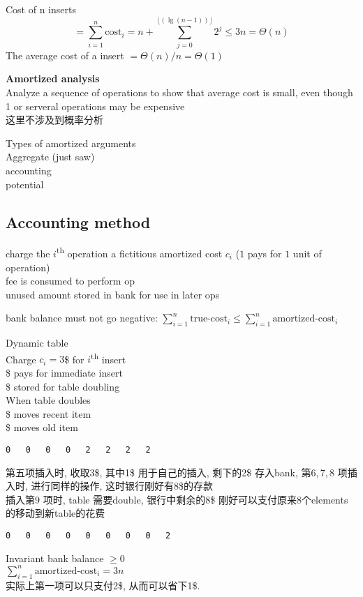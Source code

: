 \documentclass{article}
\begin{document}
Cost of n inserts
$$
=\sum_{i=1}^n \mbox{cost}_i
=n+\sum_{j=0}^{\lfloor (\lg (n-1))\rfloor } 2^j
\leq 3n = \Theta(n)
$$
The average cost of a insert $= \Theta(n)/n=\Theta(1)$

\textbf{Amortized analysis}\\
Analyze a sequence of operations to show that average cost is small, even though 1 or serveral operations may be expensive\\
这里不涉及到概率分析

Types of amortized arguments\\
Aggregate (just saw)\\
accounting\\
potential

\subsection{Accounting method}
charge the $i$\textsuperscript{th} operation a fictitious amortized cost $c_i$ ($1$ pays for $1$ unit of operation)\\
fee is consumed to perform op\\
unused amount stored in bank for use in later ops

bank balance must not go negative:
$\sum_{i=1}^n \mbox{true-cost}_i \leq \sum_{i=1}^n \mbox{amortized-cost}_i$

\bigskip
Dynamic table\\
Charge $c_i = 3$\$ for $i$\textsuperscript{th} insert\\
\$ pays for immediate insert\\
\$ stored for table doubling\\
When table doubles\\
	\$ moves recent item\\
	\$ moves old item
\begin{verbatim}
0	0	0	0	2	2	2	2
\end{verbatim}
第五项插入时, 收取3\$, 其中1\$ 用于自己的插入, 剩下的2\$ 存入bank, 第$6, 7, 8$ 项插入时, 进行同样的操作, 这时银行刚好有8\$的存款\\
插入第$9$ 项时, table 需要double, 银行中剩余的8\$ 刚好可以支付原来$8$个elements 的移动到新table的花费
\begin{verbatim}
0	0	0	0	0	0	0	0	2
\end{verbatim}

Invariant bank balance $\geq 0$\\
$\sum_{i=1}^n \mbox{amortized-cost}_i =  3n$\\
实际上第一项可以只支付2\$, 从而可以省下1\$.
\end{document}
